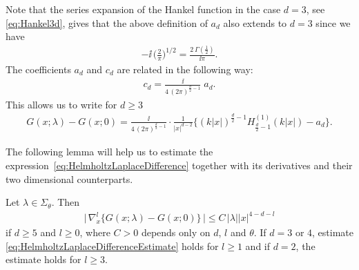 Note that the series expansion of the Hankel function in the case $d = 3$, see \eqref{eq:Hankel3d}, gives that the above definition of $a_d$ also extends to $d = 3$ since we have
\begin{align*}
  -\ii\, \bigg( \frac{2}{\pi} \bigg)^{1/2} = \frac{2\, \Gamma(\frac{1}{2})}{\ii\pi}.
\end{align*}
The coefficients $a_d$ and $c_d$ are related in the following way:
\begin{align*}
  c_d 
  =\frac{\ii} {4\, (2 \pi)^{\frac{d}{2} - 1}}\; a_d .
\end{align*}
This allows us to write for $d \geq 3$
\begin{align}
  \label{eq:HelmholtzLaplaceDifference}
  G(x;\lambda) - G(x; 0) = \frac{\ii}{4\,(2\pi)^{\frac{d}{2} - 1}} \cdot \frac{1}{|x|^{d - 2}} \Big\{ (k|x|)^{\frac{d}{2} - 1} H_{\frac{d}{2} - 1}^{(1)}(k|x|) - a_d \Big\}.
\end{align}

The following lemma will help us to estimate the expression~\eqref{eq:HelmholtzLaplaceDifference} together with its derivatives and their two dimensional counterparts.

\begin{lem}
  \label{lem:HelmholtzLaplaceDifference}
  Let $\lambda \in \Sigma_\theta$.
  Then
  \begin{align}
    \label{eq:HelmholtzLaplaceDifferenceEstimate}
    \Big|\,\nabla_x^l \Big\{ G(x; \lambda) - G(x; 0) \Big\}\,\Big| \leq C\, |\lambda| |x|^{4 - d - l}
  \end{align}
  if $d \geq 5$ and $l \geq 0$, where $C  > 0$ depends only on $d$, $l$ and $\theta$.
  If $d = 3$ or $4$, estimate \eqref{eq:HelmholtzLaplaceDifferenceEstimate} holds for $l \geq 1$ and if $d = 2$, the estimate holds for $l \geq 3$.
\end{lem}

